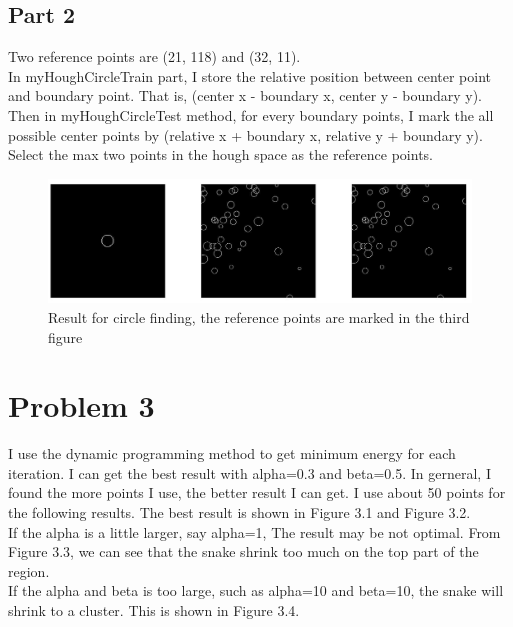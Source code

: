 \documentclass[paper=a4, fontsize=11pt]{scrartcl} %
\numberwithin{equation}{section} %
\numberwithin{figure}{section} %
\numberwithin{table}{subsection} %
\begin{document}
\subsection{Part 2}

Two reference points are (21, 118) and (32, 11).
\\

In myHoughCircleTrain part, I store the relative position between center point and boundary point.
That is, (center x - boundary x,  center y - boundary y).
Then in myHoughCircleTest method, for every boundary points, I mark the all possible center points
by (relative x + boundary x,  relative y + boundary y).
Select the max two points in the hough space as the reference points.


\begin{figure}[!htbp]
	\centering
	\includegraphics[width = 16cm]{p2_4.jpg}
	\caption{Result for circle finding, the reference points are marked in the third figure}
\end{figure}

\newpage


\section{Problem 3}

I use the dynamic programming method to get minimum energy for each iteration.
I can get the best result with alpha=0.3 and beta=0.5. 
In gerneral, I found the more points I use, the better result I can get.
I use about 50 points for the following results.
The best result is shown in Figure 3.1 and Figure 3.2.
\\

If the alpha is a little larger, say alpha=1, The result may be not optimal. From Figure 3.3, we can see that the snake shrink too much on the top part of the region.
\\

If the alpha and beta is too large, such as alpha=10 and beta=10, the snake will shrink to a cluster. This is shown in Figure 3.4.
\\
\end{document}
